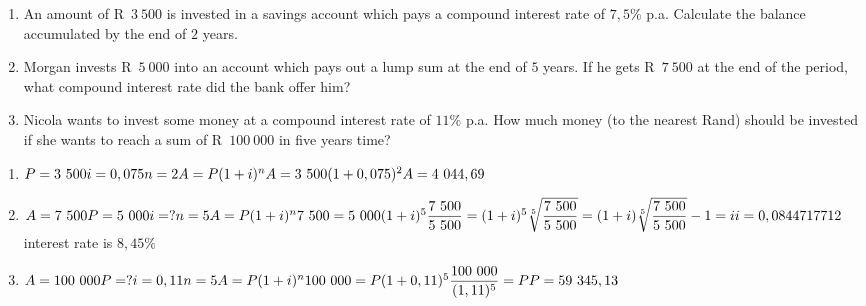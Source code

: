 \begin{exercises}{}{
    \begin{enumerate}[label=\textbf{\arabic*}.]
	\item An amount of R~$3~500$ is invested in a savings account which pays a compound interest rate of $7,5\%$ p.a. Calculate the balance accumulated by the end of $2$ years.
	\item Morgan invests R~$5~000$ into an account which pays out a lump sum at the end of $5$ years. If he gets R~$7~500$ at the end of the period, what compound interest rate did the bank offer him?
	\item Nicola wants to invest some money at a compound interest rate of $11\%$ p.a. How much money (to the nearest Rand) should be invested if she wants to reach a sum of R~$100~000$ in five years time?\\
    \end{enumerate}
}
\end{exercises}


 \begin{solutions}{}{
\begin{enumerate}[itemsep=5pt, label=\textbf{\arabic*}. ] 


\item $P = 3~500\\
i=0,075\\
n=2\\
A=P(1 + i)^{n}\\
A = 3~500(1 + 0,075)^{2}\\
A = 4~044,69$
\item $A = 7~500
P = 5~000\\
i=?\\
n=5\\
A=P(1 + i)^{n}\\
7~500 = 5~000(1 + i)^{5}\\
\dfrac{7~500}{5~500} = (1+i)^5\\
\sqrt[5]{\dfrac{7~500}{5~500}} = (1+i)\\
\sqrt[5]{\dfrac{7~500}{5~500}} - 1 = i\\
i = 0,0844717712$\\
interest rate is $8,45 \%$
\item $A = 100~000\\
P=?\\
i=0,11\\
n=5\\
A=P(1 + i)^{n}\\
100~000 = P(1 + 0,11)^{5}\\
\dfrac{100~000}{(1,11)^5} = P\\
P = 59~345,13$

\end{enumerate}}
\end{solutions}


